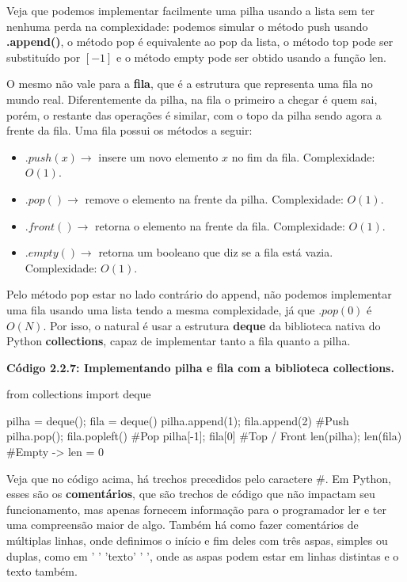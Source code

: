 \documentclass[11pt, a4paper]{article}
\begin{document}
Veja que podemos implementar facilmente uma pilha usando a lista sem ter nenhuma perda na complexidade: podemos simular o método push usando \textbf{.append()}, o método pop é equivalente ao pop da lista, o método top pode ser substituído por \([-1]\) e o método empty pode ser obtido usando a função len. 

O mesmo não vale para a \textbf{fila}, que é a estrutura que representa uma fila no mundo real. Diferentemente da pilha, na fila o primeiro a chegar é quem sai, porém, o restante das operações é similar, com o topo da pilha sendo agora a frente da fila. Uma fila possui os métodos a seguir:

\begin{itemize}
    \item \(.push(x) \rightarrow\) insere um novo elemento \(x\) no fim da fila. Complexidade: \(O(1)\).

    \item \(.pop() \rightarrow\) remove o elemento na frente da pilha. Complexidade: \(O(1)\).

    \item \(.front() \rightarrow\) retorna o elemento na frente da fila. Complexidade: \(O(1)\).

    \item \(.empty() \rightarrow\) retorna um booleano que diz se a fila está vazia. Complexidade: \(O(1)\).
    
\end{itemize}

Pelo método pop estar no lado contrário do append, não podemos implementar uma fila usando uma lista tendo a mesma complexidade, já que \(.pop(0)\) é \(O(N)\). Por isso, o natural é usar a estrutura \textbf{deque} da biblioteca nativa do Python \textbf{collections}, capaz de implementar tanto a fila quanto a pilha.

\textbf{Código 2.2.7: Implementando pilha e fila com a biblioteca collections.}

\begin{code}
from collections import deque

pilha = deque(); fila = deque()
pilha.append(1); fila.append(2) #Push
pilha.pop(); fila.popleft() #Pop
pilha[-1]; fila[0] #Top / Front
len(pilha); len(fila) #Empty -> len = 0
\end{code}

Veja que no código acima, há trechos precedidos pelo caractere \#. Em Python, esses são os \textbf{comentários}, que são trechos de código que não impactam seu funcionamento, mas apenas fornecem informação para o programador ler e ter uma compreensão maior de algo. Também há como fazer comentários de múltiplas linhas, onde definimos o início e fim deles com três aspas, simples ou duplas, como em ' ' 'texto' ' ', onde as aspas podem estar em linhas distintas e o texto também.
\end{document}
